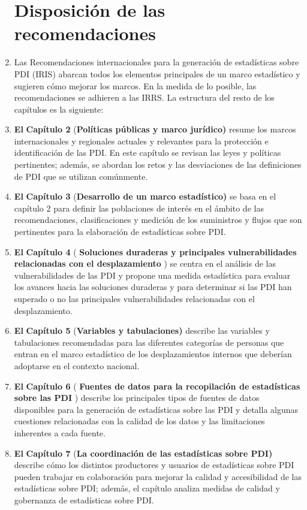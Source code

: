 \documentclass[
]{book}
\begin{document}
\begin{enumerate}
{  \section{Disposición de las recomendaciones}\label{disposiciuxf3n-de-las-recomendaciones}}
\item
  Las Recomendaciones internacionales para la generación de estadísticas sobre PDI (IRIS) abarcan todos los elementos principales de un marco estadístico y sugieren cómo mejorar los marcos. En la medida de lo posible, las recomendaciones se adhieren a las IRRS. La estructura del resto de los capítulos es la siguiente:
\item
  \textbf{El} \textbf{Capítulo 2} (\textbf{Políticas públicas y marco jurídico)} resume los marcos internacionales y regionales actuales y relevantes para la protección e identificación de las PDI. En este capítulo se revisan las leyes y políticas pertinentes; además, se abordan los retos y las desviaciones de las definiciones de PDI que se utilizan comúnmente.
\item
  \textbf{El} \textbf{Capítulo 3} (\textbf{Desarrollo de un marco estadístico)} se basa en el capítulo 2 para definir las poblaciones de interés en el ámbito de las recomendaciones, clasificaciones y medición de los suministros y flujos que son pertinentes para la elaboración de estadísticas sobre PDI.
\item
  \textbf{El} \textbf{Capítulo 4} ( \textbf{Soluciones duraderas y principales vulnerabilidades relacionadas con el desplazamiento} ) se centra en el análisis de las vulnerabilidades de las PDI y propone una medida estadística para evaluar los avances hacia las soluciones duraderas y para determinar si las PDI han superado o no las principales vulnerabilidades relacionadas con el desplazamiento.
\item
  \textbf{El} \textbf{Capítulo 5} (\textbf{Variables y tabulaciones)} describe las variables y tabulaciones recomendadas para las diferentes categorías de personas que entran en el marco estadístico de los desplazamientos internos que deberían adoptarse en el contexto nacional.
\item
  \textbf{El} \textbf{Capítulo 6} ( \textbf{Fuentes de datos para la recopilación de estadísticas sobre las PDI} ) describe los principales tipos de fuentes de datos disponibles para la generación de estadísticas sobre las PDI y detalla algunas cuestiones relacionadas con la calidad de los datos y las limitaciones inherentes a cada fuente.
\item
  \textbf{El} \textbf{Capítulo 7} (\textbf{La coordinación de las estadísticas sobre PDI)} describe cómo los distintos productores y usuarios de estadísticas sobre PDI pueden trabajar en colaboración para mejorar la calidad y accesibilidad de las estadísticas sobre PDI; además, el capítulo analiza medidas de calidad y gobernanza de estadísticas sobre PDI.
\end{enumerate}
\end{document}
